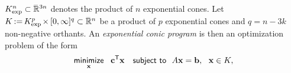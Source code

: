 %
$K_{\exp}^n \subset \smash{\mskip1mu\overline{\mskip-1mu\mathbb R\!}\,}\vphantom{R}^{3n}$ denotes the 
product
of $n$ exponential cones. 
Let $K \mskip-2mu := \mskip-2mu K_{\exp}^p \mskip-2mu \times \mskip-1mu
[0, \infty]^q 
\subset \smash{\mskip1mu\overline{\mskip-1mu\mathbb R\!}\,}^n$ be a product of $p$ exponential cones and $q = n - 3k$ non-negative orthants.
An \emph{exponential conic program} is then an optimization problem of the form
\begin{equation}
    \minimize
        _{\mat x}
        ~~ \mat c^{\sf T} \mat x
    \quad\subjto
    ~~ A \mat x = \mat b,~~\mat x \in 
        K,
        \label{eq:exp-conic-program}
\end{equation}
